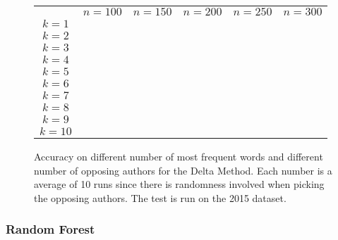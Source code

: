 \begin{figure}
    \begin{tabular}{cccccc}
               & $n=100$ & $n=150$ & $n=200$ & $n=250$ & $n=300$ \\
        $k=1$  &         &         &         &         &         \\
        $k=2$  &         &         &         &         &         \\
        $k=3$  &         &         &         &         &         \\
        $k=4$  &         &         &         &         &         \\
        $k=5$  &         &         &         &         &         \\
        $k=6$  &         &         &         &         &         \\
        $k=7$  &         &         &         &         &         \\
        $k=8$  &         &         &         &         &         \\
        $k=9$  &         &         &         &         &         \\
        $k=10$ &         &         &         &         &
    \end{tabular}
    \caption{Accuracy on different number of most frequent words and different
        number of opposing authors for the Delta Method. Each number is a
        average of 10 runs since there is randomness involved when picking the
        opposing authors. The test is run on the 2015 dataset.}
\end{figure}

\subsubsection{Random Forest}
